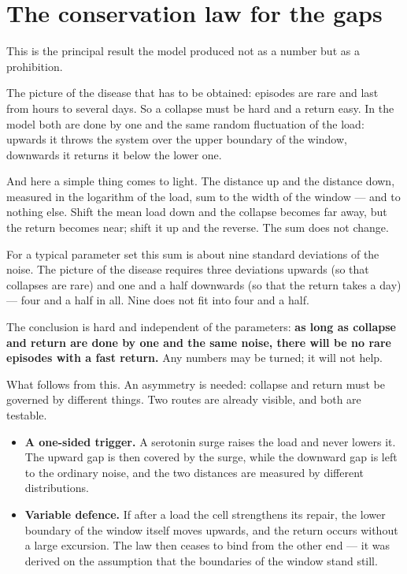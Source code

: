 \section{The conservation law for the gaps}\label{sec:law}

This is the principal result the model produced not as a number but as a prohibition.

The picture of the disease that has to be obtained: episodes are rare and last from hours to several days. So a collapse must be hard and a return easy. In the model both are done by one and the same random fluctuation of the load: upwards it throws the system over the upper boundary of the window, downwards it returns it below the lower one.

And here a simple thing comes to light. The distance up and the distance down, measured in the logarithm of the load, sum to the width of the window --- and to nothing else. Shift the mean load down and the collapse becomes far away, but the return becomes near; shift it up and the reverse. The sum does not change.

For a typical parameter set this sum is about nine standard deviations of the noise. The picture of the disease requires three deviations upwards (so that collapses are rare) and one and a half downwards (so that the return takes a day) --- four and a half in all. Nine does not fit into four and a half.

The conclusion is hard and independent of the parameters: \textbf{as long as collapse and return are done by one and the same noise, there will be no rare episodes with a fast return.} Any numbers may be turned; it will not help.

What follows from this. An asymmetry is needed: collapse and return must be governed by different things. Two routes are already visible, and both are testable.

\begin{itemize}
\item \textbf{A one-sided trigger.} A serotonin surge raises the load and never lowers it. The upward gap is then covered by the surge, while the downward gap is left to the ordinary noise, and the two distances are measured by different distributions.
\item \textbf{Variable defence.} If after a load the cell strengthens its repair, the lower boundary of the window itself moves upwards, and the return occurs without a large excursion. The law then ceases to bind from the other end --- it was derived on the assumption that the boundaries of the window stand still.
\end{itemize}

